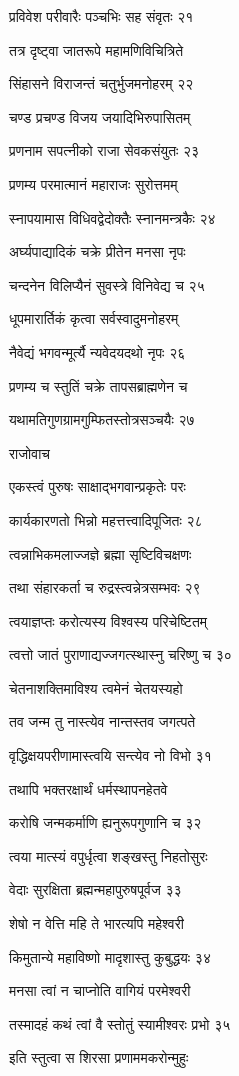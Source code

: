 प्रविवेश परीवारैः पञ्चभिः सह संवृतः २१

तत्र दृष्ट्वा जातरूपे महामणिविचित्रिते

सिंहासने विराजन्तं चतुर्भुजमनोहरम् २२

चण्ड प्रचण्ड विजय जयादिभिरुपासितम्

प्रणनाम सपत्नीको राजा सेवकसंयुतः २३

प्रणम्य परमात्मानं महाराजः सुरोत्तमम्

स्नापयामास विधिवद्वेदोक्तैः स्नानमन्त्रकैः २४

अर्घ्यपाद्यादिकं चक्रे प्रीतेन मनसा नृपः

चन्दनेन विलिप्यैनं सुवस्त्रे विनिवेद्य च २५

धूपमारार्तिकं कृत्वा सर्वस्वादुमनोहरम्

नैवेद्यं भगवन्मूर्त्यै न्यवेदयदथो नृपः २६

प्रणम्य च स्तुतिं चक्रे तापसब्राह्मणेन च

यथामतिगुणग्रामगुम्फितस्तोत्रसञ्चयैः २७

राजोवाच

एकस्त्वं पुरुषः साक्षाद्भगवान्प्रकृतेः परः

कार्यकारणतो भिन्नो महत्तत्त्वादिपूजितः २८

त्वन्नाभिकमलाज्जज्ञे ब्रह्मा सृष्टिविचक्षणः

तथा संहारकर्ता च रुद्रस्त्वन्नेत्रसम्भवः २९

त्वयाज्ञप्तः करोत्यस्य विश्वस्य परिचेष्टितम्

त्वत्तो जातं पुराणाद्यज्जगत्स्थास्नु चरिष्णु च ३०

चेतनाशक्तिमाविश्य त्वमेनं चेतयस्यहो

तव जन्म तु नास्त्येव नान्तस्तव जगत्पते

वृद्धिक्षयपरीणामास्त्वयि सन्त्येव नो विभो ३१

तथापि भक्तरक्षार्थं धर्मस्थापनहेतवे

करोषि जन्मकर्माणि ह्यनुरूपगुणानि च ३२

त्वया मात्स्यं वपुर्धृत्वा शङ्खस्तु निहतोसुरः

वेदाः सुरक्षिता ब्रह्मन्महापुरुषपूर्वज ३३

शेषो न वेत्ति महि ते भारत्यपि महेश्वरी

किमुतान्ये महाविष्णो मादृशास्तु कुबुद्धयः ३४

मनसा त्वां न चाप्नोति वागियं परमेश्वरी

तस्मादहं कथं त्वां वै स्तोतुं स्यामीश्वरः प्रभो ३५

इति स्तुत्वा स शिरसा प्रणाममकरोन्मुहुः

